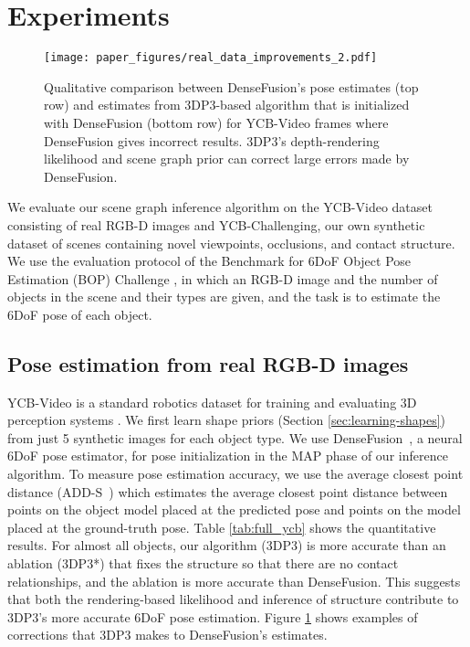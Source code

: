 \section{Experiments} \label{sec:experiments}


\begin{figure}[t]
	\centering
	\texttt{[image: paper\_figures/real\_data\_improvements\_2.pdf]}
	\caption{%
Qualitative comparison between DenseFusion's pose estimates (top row)
and estimates from 3DP3-based algorithm that is initialized with DenseFusion (bottom row)
for YCB-Video frames where DenseFusion gives incorrect results.
3DP3's depth-rendering likelihood and scene graph prior can correct large errors made by DenseFusion.
}
	\label{fig:real-data-improvements}
\end{figure}


\vspace{-2mm}We evaluate our scene graph inference algorithm on the YCB-Video \cite{calli2015benchmarking} dataset consisting of real RGB-D images
and YCB-Challenging, our own synthetic dataset of scenes containing novel viewpoints,
occlusions, and contact structure.
We use the evaluation protocol of the Benchmark for 6DoF Object Pose Estimation (BOP) Challenge \cite{hodan2018bop}, in which an RGB-D image and the number of objects in the scene and their types are given,
and the task is to estimate the 6DoF pose of each object.

\subsection{Pose estimation from real RGB-D images}

YCB-Video is a standard robotics dataset for training and evaluating 3D perception systems \cite{calli2015benchmarking}.
We first learn shape priors (Section \ref{sec:learning-shapes}) from just 5 synthetic images for each object type.
We use DenseFusion~\cite{wang2019densefusion}, a neural 6DoF pose estimator, for pose initialization in the MAP phase of our inference algorithm.
To measure pose estimation accuracy, we use the average closest point distance (ADD-S~\citep{xiang2017posecnn, wang2019densefusion}) which estimates the average closest point distance between points on the object model
placed at the predicted pose and points on the model placed at the ground-truth pose.
Table \ref{tab:full_ycb} shows the quantitative results.
For almost all objects, our algorithm (3DP3) is more accurate than an ablation (3DP3*) that fixes the structure so that there are no contact relationships,
and the ablation is more accurate than DenseFusion.
This suggests that both the rendering-based likelihood and inference of structure contribute to 3DP3's more accurate 6DoF pose estimation.
Figure \ref{fig:real-data-improvements} shows examples of corrections that 3DP3 makes to DenseFusion's estimates.


